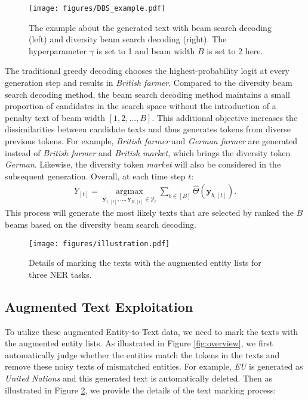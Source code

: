 \begin{figure}
    \centering
    \texttt{[image: figures/DBS\_example.pdf]}
    \caption{The example about the generated text with beam search decoding (left) and diversity beam search decoding (right). The hyperparameter $\gamma$ is set to 1 and beam width $B$ is set to 2 here.}
    \label{fig:DBS}
\vspace{-4mm}
\end{figure} 

The traditional greedy decoding chooses the highest-probability logit at every generation step and results in \textit{British farmer}. Compared to the diversity beam search decoding method, the beam search decoding method maintains a small proportion of candidates in the search space without the introduction of a penalty text of beam width $[1,2,...,B]$. This additional objective increases the dissimilarities between candidate texts and thus generates tokens from diverse previous tokens. For example, \textit{British farmer} and \textit{German farmer} are generated instead of \textit{British farmer} and \textit{British market}, which brings the diversity token \textit{German}. Likewise, the diversity token \textit{market} will also be considered in the subsequent generation.
Overall, at each time step $t$:
\begin{align}
Y_{[t]}=\underset{\mathbf{y}_{1,[t]}, \ldots, \mathbf{y}_{B,[t]} \in \mathcal{Y}_{t}}{\operatorname{argmax}} \sum_{b \in[B]} \hat{\Theta}\left(\mathbf{y}_{b,[t]}\right).
\end{align}
This process will generate the most likely texts that are selected by ranked the $B$ beams based on the diversity beam search decoding.

\begin{figure}[t!]
    \centering
    \texttt{[image: figures/illustration.pdf]}
    \caption{Details of marking the texts with the augmented entity lists for three NER tasks.}
    \label{fig:illustration}
\vspace{-4mm}
\end{figure}

\subsection{Augmented Text Exploitation}\label{exploitation}
To utilize these augmented Entity-to-Text data, we need to mark the texts with the augmented entity lists. 
As illustrated in Figure \ref{fig:overview}, we first automatically judge whether the entities match the tokens in the texts and remove these noisy texts of mismatched entities.
For example, \textit{EU} is generated as \textit{United Nations} and this generated text is automatically deleted.
Then as illustrated in Figure \ref{fig:illustration}, we provide the details of the text marking process:

